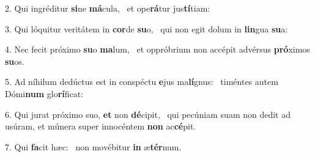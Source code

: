 2. Qui ingréditur \textbf{si}ne \textbf{má}cula, \ast\  et ope\textbf{rá}tur jus\textbf{tí}tiam:\

3. Qui lóquitur veritátem in \textbf{cor}de \textbf{su}o, \ast\  qui non egit dolum in \textbf{lin}gua \textbf{su}a:\

4. Nec fecit próximo \textbf{su}o \textbf{ma}lum, \ast\  et oppróbrium non accépit advérsus \textbf{pró}ximos \textbf{su}os.\

5. Ad níhilum dedúctus est in conspéctu \textbf{e}jus ma\textbf{lí}gnus: \ast\  timéntes autem Dómi\textbf{num} glo\textbf{rí}ficat:\

6. Qui jurat próximo suo, \textbf{et} non \textbf{dé}cipit, \ast\  qui pecúniam suam non dedit ad usúram, et múnera super innocéntem \textbf{non} ac\textbf{cé}pit.\

7. Qui \textbf{fa}cit hæc: \ast\  non movébitur \textbf{in} æ\textbf{tér}num.\

